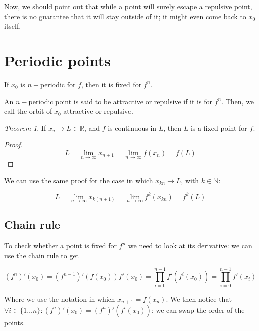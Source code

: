 \documentclass[12pt,a4paper]{report}
\numberwithin{equation}{section}
\theoremstyle{definition}
\theoremstyle{remark}
\newtheorem{theorem}{Theorem}[section]
\begin{document}
Now, we should point out that while a point will surely escape a repulsive point, there is no guarantee that it will stay outside of it; it might even come back to $x_0$ itself.

\section{Periodic points}

If $x_0$ is $n-$periodic for $f$, then it is fixed for $f^n$.

An $n-$periodic point is said to be attractive or repulsive if it is for $f^n$. Then, we call the orbit of $x_0$ attractive or repulsive.

\begin{theorem}
If $x_n \rightarrow L \in \mathbb{R}$, and $f$ is continuous in $L$, then $L$ is a fixed point for $f$.
\end{theorem}

\begin{proof}
\begin{equation}
L = \lim_{n\rightarrow \infty} x_{n+1} = \lim_{n \rightarrow \infty} f(x_n) = f(L)
\end{equation}
\end{proof}

We can use the same proof for the case in which $x_{kn} \rightarrow L$, with $k \in \mathbb{N}$:

\begin{equation}
L = \lim_{n\rightarrow \infty} x_{k(n+1)} = \lim_{n \rightarrow \infty} f^k(x_{kn}) = f^k(L)
\end{equation}

\subsection{Chain rule}

To check whether a point is fixed for $f^n$ we need to look at its derivative: we can use the chain rule to get

\begin{equation}
(f^n)' (x_0) = (f^{n-1})' (f(x_0)) f'(x_0) = \prod_{i=0}^{n-1} f'(f^i(x_0)) =\prod_{i=0}^{n-1} f'(x_i)
\end{equation}

Where we use the notation in which $x_{n+1} = f(x_n)$.
We then notice that $\forall i \in \lbrace 1 \dots n \rbrace: (f^n)' (x_0) = (f^n)'(f^i (x_0))$: we can swap the order of the points.
\end{document}
